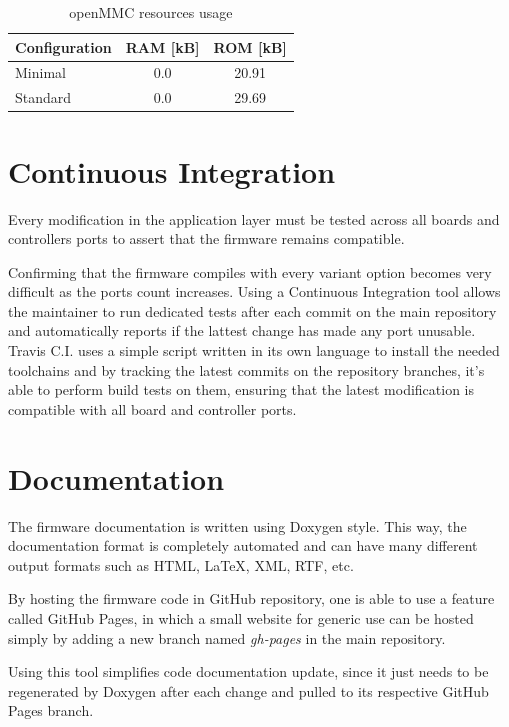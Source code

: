 \documentclass[a4paper,
              ]{jacow}
\begin{document}
\begin{table}[hbt]
  \centering
  \caption{openMMC resources usage}
  \label{table:mem_usage}
  \begin{tabular}{lcc}
    \toprule
    \textbf{Configuration} & \textbf{RAM [kB]} & \textbf{ROM [kB]} \\
    \midrule
    Minimal                & 0.0               & 20.91  \\
    Standard               & 0.0               & 29.69  \\
       \bottomrule
  \end{tabular}
\end{table}

\section{Continuous Integration}
Every modification in the application layer must be tested across all boards and controllers ports to assert that the firmware remains compatible.

Confirming that the firmware compiles with every variant option becomes very difficult as the ports count increases.
Using a Continuous Integration tool allows the maintainer to run dedicated tests after each commit on the main repository and automatically reports if the lattest change has made any port unusable.
Travis C.I. uses a simple script written in its own language to install the needed toolchains and by tracking the latest commits on the repository branches, it's able to perform build tests on them, ensuring that the latest modification is compatible with all board and controller ports.

\section{Documentation}
The firmware documentation is written using Doxygen style. This way, the documentation format is completely automated and can have many different output formats such as HTML, \LaTeX , XML, RTF, etc.

By hosting the firmware code in GitHub repository, one is able to use a feature called GitHub Pages, in which a small website for generic use can be hosted simply by adding a new branch named \emph{gh-pages} in the main repository.

Using this tool simplifies code documentation update, since it just needs to be regenerated by Doxygen after each change and pulled to its respective GitHub Pages branch.
\end{document}
